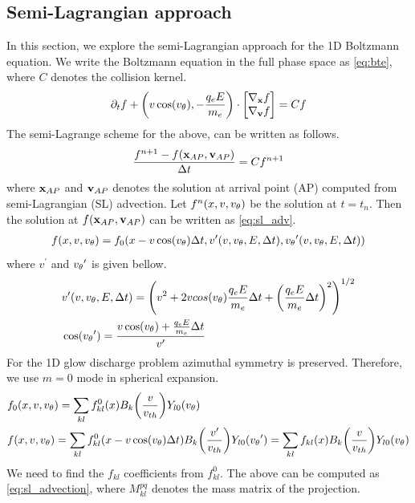 \documentclass{article}[draft]
\begin{document}
\subsection{Semi-Lagrangian approach}
In this section, we explore the semi-Lagrangian approach for the 1D Boltzmann equation. We write the Boltzmann equation in the full phase space as \eqref{eq:bte}, where $C$ denotes the collision kernel. 
\begin{align}
	\partial_t f + \of{v\cos(\vtheta), -\frac{q_e E}{m_e}} \cdot \begin{bmatrix}
		\nabla_{\vect{x}} f \\
		\nabla_{\vect{v}} f
	\end{bmatrix} = Cf \label{eq:bte}
\end{align}
The semi-Lagrange scheme for the above, can be written as follows. 
\begin{align}
	\frac{f^{n+1} - f(\mathbf{x}_{AP}, \mathbf{v}_{AP})}{\Delta t} = Cf^{n+1}
\end{align} where $\mathbf{x}_{AP}$ and $\mathbf{v}_{AP}$ denotes the solution at arrival point (AP) computed from semi-Lagrangian (SL) advection. Let $f^{n}(x,v,{v_{\theta}})$ be the solution at $t=t_n$. Then the solution at $f(\mathbf{x}_{AP}, \mathbf{v}_{AP})$ can be written as \eqref{eq:sl_adv}. %
\begin{align}
	f(x, v, \vtheta) = f_0(x-v\cos\of{\vtheta} \Delta t, v^\prime\of{v, \vtheta, E, \Delta t}, \vtheta^\prime \of{v, \vtheta, E, \Delta t} ) \label{eq:sl_adv}
\end{align} where $v^\prime$ and ${v_{\theta}}^\prime$ is given bellow.  
\begin{align}
&v^\prime\of{v, \vtheta, E, \Delta t} = \of{v^2 + 2v cos\of{\vtheta} \frac{q_e E}{m_e}\Delta t +  \of{\frac{q_e E}{m_e}\Delta t}^2 }^{1/2} \\
&\cos\of{\vtheta^\prime}  =  \frac{v\cos\of{\vtheta} + \frac{q_e E}{m_e} \Delta t}{v^\prime}
\end{align} For the 1D glow discharge problem azimuthal symmetry is preserved. Therefore, we use $m=0$ mode in spherical expansion. 
\begin{align}
	&f_0(x, v, \vtheta) = \sum_{kl} f^{0}_{kl}\of{x} B_k\of {\frac{v}{v_{th}}} Y_{l0}\of{\vtheta} \\
	&f(x, v, \vtheta)    = \sum_{kl} f^{0}_{kl}\of{x-v\cos\of{\vtheta}\Delta t} B_k\of {\frac{v^\prime}{v_{th}}} Y_{l0}\of{\vtheta^\prime} = \sum_{kl} f_{kl}(x) B_k\of{\frac{v}{v_{th}}} Y_{l0}\of{\vtheta}
\end{align} We need to find the $f_{kl}$ coefficients from $f^{0}_{kl}$. The above can be computed as \eqref{eq:sl_advection}, where $M^{pq}_{kl}$ denotes the mass matrix of the projection. 
\end{document}
